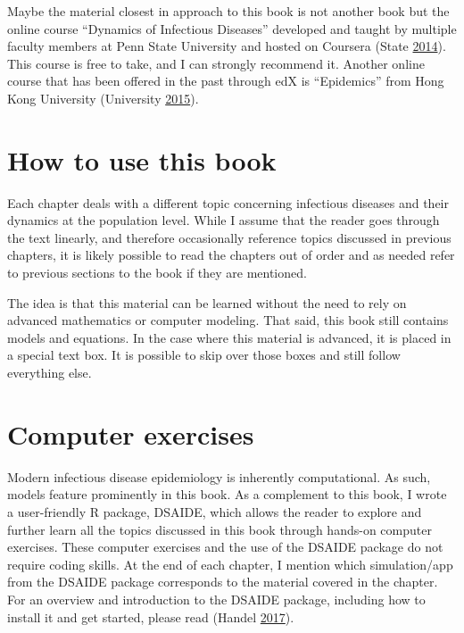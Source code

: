 \documentclass[]{book}
\theoremstyle{definition}
\theoremstyle{definition}
\theoremstyle{definition}
\theoremstyle{remark}
\begin{document}
Maybe the material closest in approach to this book is not another book
but the online course ``Dynamics of Infectious Diseases'' developed and
taught by multiple faculty members at Penn State University and hosted
on Coursera (State \protect\hyperlink{ref-epimooc}{2014}). This course
is free to take, and I can strongly recommend it. Another online course
that has been offered in the past through edX is ``Epidemics'' from Hong
Kong University (University \protect\hyperlink{ref-hkepidemics}{2015}).

\hypertarget{how-to-use-this-book}{%
\section{How to use this book}\label{how-to-use-this-book}}

Each chapter deals with a different topic concerning infectious diseases
and their dynamics at the population level. While I assume that the
reader goes through the text linearly, and therefore occasionally
reference topics discussed in previous chapters, it is likely possible
to read the chapters out of order and as needed refer to previous
sections to the book if they are mentioned.

The idea is that this material can be learned without the need to rely
on advanced mathematics or computer modeling. That said, this book still
contains models and equations. In the case where this material is
advanced, it is placed in a special text box. It is possible to skip
over those boxes and still follow everything else.

\hypertarget{computer-exercises}{%
\section{Computer exercises}\label{computer-exercises}}

Modern infectious disease epidemiology is inherently computational. As
such, models feature prominently in this book. As a complement to this
book, I wrote a user-friendly R package, DSAIDE, which allows the reader
to explore and further learn all the topics discussed in this book
through hands-on computer exercises. These computer exercises and the
use of the DSAIDE package do not require coding skills. At the end of
each chapter, I mention which simulation/app from the DSAIDE package
corresponds to the material covered in the chapter. For an overview and
introduction to the DSAIDE package, including how to install it and get
started, please read (Handel \protect\hyperlink{ref-handel17}{2017}).
\end{document}
